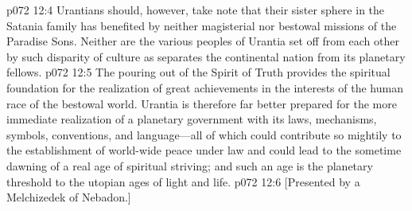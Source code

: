 \pc \vs p072 12:4 Urantians should, however, take note that their sister sphere in the Satania family has benefited by neither magisterial nor bestowal missions of the Paradise Sons. Neither are the various peoples of Urantia set off from each other by such disparity of culture as separates the continental nation from its planetary fellows.
\vs p072 12:5 The pouring out of the Spirit of Truth provides the spiritual foundation for the realization of great achievements in the interests of the human race of the bestowal world. Urantia is therefore far better prepared for the more immediate realization of a planetary government with its laws, mechanisms, symbols, conventions, and language---all of which could contribute so mightily to the establishment of world\hyp{}wide peace under law and could lead to the sometime dawning of a real age of spiritual striving; and such an age is the planetary threshold to the utopian ages of light and life.
\vsetoff
\vs p072 12:6 [Presented by a Melchizedek of Nebadon.]
